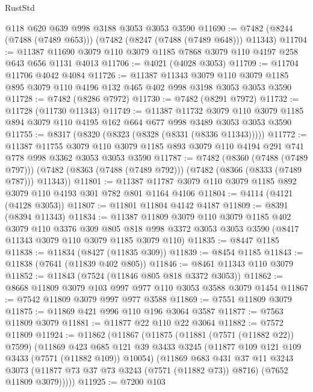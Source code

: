 \begin{lexlean}{RustStd}
\begin{coremodule}
{\begin{coremodule}
{{{{{{{{{{{{{{{{{{{{{{{{{{{{{{{{    @118
    @620
    @639
    @998
    @3188
    @3053
    @3053
    @3590
@11690 := @7482 (@8244 (@7488 (@7489 @653))) (@7482 (@8247 (@7488 (@7489 @648))) @11343)
@11704 := @11387 @11690 @3079 @110 @3079 @1185 @7868 @3079 @110 @4197 @258 @643 @656 @1131 @4013
@11706 := @4021 (@4028 @3053)
@11709 := @11704 @11706 @4042 @4084
@11726 := @11387
    @11343
    @3079
    @110
    @3079
    @1185
    @895
    @3079
    @110
    @4196
    @132
    @465
    @402
    @998
    @3198
    @3053
    @3053
    @3590
@11728 := @7482 (@8286 @7972)
@11730 := @7482 (@8291 @7972)
@11732 := @11728 (@11730 @11343)
@11749 := @11387
    @11732
    @3079
    @110
    @3079
    @1185
    @894
    @3079
    @110
    @4195
    @162
    @664
    @677
    @998
    @3489
    @3053
    @3053
    @3590
@11755 := @8317 (@8320 (@8323 (@8328 (@8331 (@8336 @11343)))))
@11772 := @11387
    @11755
    @3079
    @110
    @3079
    @1185
    @893
    @3079
    @110
    @4194
    @291
    @741
    @778
    @998
    @3362
    @3053
    @3053
    @3590
@11787 := @7482
    (@8360 (@7488 (@7489 @797)))
    (@7482 (@8363 (@7488 (@7489 @792))) (@7482 (@8366 (@8333 (@7489 @787))) @11343))
@11801 := @11387 @11787 @3079 @110 @3079 @1185 @892 @3079 @110 @4193 @301 @782 @801 @1164 @4106
@11804 := @4114 (@4121 (@4128 @3053))
@11807 := @11801 @11804 @4142 @4187
@11809 := @8391 (@8394 @11343)
@11834 := @11387
    @11809
    @3079
    @110
    @3079
    @1185
    @402
    @3079
    @110
    @3376
    @309
    @805
    @818
    @998
    @3372
    @3053
    @3053
    @3590
    (@8417 @11343 @3079 @110 @3079 @1185 @3079 @110)
@11835 := @8447 @1185
@11838 := @11834 (@8427 (@11835 @309))
@11839 := @8454 @1185
@11843 := @11838 (@7641 (@11839 @402 @805))
@11846 := @8461 @11343 @110 @3079
@11852 := @11843 (@7524 (@11846 @805 @818 @3372 @3053))
@11862 := @8668 @11809 @3079 @103 @997 @977 @110 @3053 @3588 @3079 @1454
@11867 := @7542 @11809 @3079 @997 @977 @3588
@11869 := @7551 @11809 @3079
@11875 := @11869 @421 @996 @110 @196 @3064 @3587
@11877 := @7563 @11809 @3079
@11881 := @11877 @22 @110 @22 @3064
@11882 := @7572 @11809
@11924 := @11862
    (@11867
      (@11875
        (@11881 (@7571 (@11882 @22)) @7599)
        (@11869
          @423
          @685
          @121
          @39
          @3433
          @3245
          (@11877 @109 @121 @109 @3433 (@7571 (@11882 @109)) @10054)
          (@11869
            @683
            @431
            @37
            @11
            @3243
            @3073
            (@11877 @73 @37 @73 @3243 (@7571 (@11882 @73)) @8716)
            (@7652 @11809 @3079)))))
@11925 := @7200 @103
}}}}}}}}}}}}}}}}}}}}}}}}}}}}}}}}
\end{coremodule}}
\end{coremodule}
\end{lexlean}

